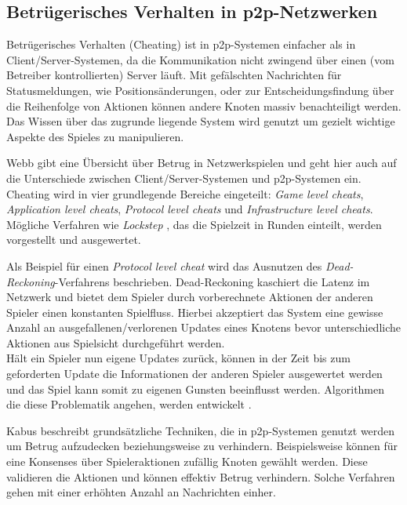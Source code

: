 \subsection{Betrügerisches Verhalten in p2p-Netzwerken}
\label{chap:grundlagen:cheating}
Betrügerisches Verhalten (Cheating) ist in p2p-Systemen einfacher als in Client/Server-Systemen, da die Kommunikation nicht zwingend über einen (vom Betreiber kontrollierten) Server läuft. Mit gefälschten Nachrichten für Statusmeldungen, wie Positionsänderungen, oder zur Entscheidungsfindung über die Reihenfolge von Aktionen können andere Knoten massiv benachteiligt werden. Das Wissen über das zugrunde liegende System wird genutzt um gezielt wichtige Aspekte des Spieles zu manipulieren.

Webb \cite{Webb2007Cheating} gibt eine Übersicht über Betrug in Netzwerkspielen und geht hier auch auf die Unterschiede zwischen Client/Server-Systemen und p2p-Systemen ein. Cheating wird in vier grundlegende Bereiche eingeteilt: \emph{Game level cheats}, \emph{Application level cheats}, \emph{Protocol level cheats} und \emph{Infrastructure level cheats}. Mögliche Verfahren wie \emph{Lockstep} \cite{Baughman2007}, das die Spielzeit in Runden einteilt, werden vorgestellt und ausgewertet.

Als Beispiel für einen \emph{Protocol level cheat} wird das Ausnutzen des \emph{Dead-Reckoning}-Verfahrens \cite{Pantel2002} beschrieben. Dead-Reckoning kaschiert die Latenz im Netzwerk und bietet dem Spieler durch vorberechnete Aktionen der anderen Spieler einen konstanten Spielfluss. Hierbei akzeptiert das System eine gewisse Anzahl an ausgefallenen/verlorenen Updates eines Knotens bevor unterschiedliche Aktionen aus Spielsicht durchgeführt werden.\\
Hält ein Spieler nun eigene Updates zurück, können in der Zeit bis zum geforderten Update die Informationen der anderen Spieler ausgewertet werden und das Spiel kann somit zu eigenen Gunsten beeinflusst werden. Algorithmen die diese Problematik angehen, werden entwickelt \cite{Aggarwal2005}.

Kabus \cite{Kabus2007Design, Kabus2009} beschreibt grundsätzliche Techniken, die in p2p-Systemen genutzt werden um Betrug aufzudecken beziehungsweise zu verhindern. Beispielsweise können für eine Konsenses über Spieleraktionen zufällig Knoten gewählt werden. Diese validieren die Aktionen und können effektiv Betrug verhindern. Solche Verfahren gehen mit einer erhöhten Anzahl an Nachrichten einher.

